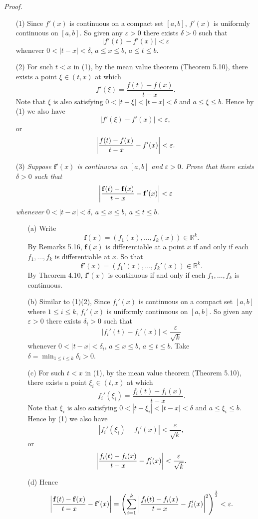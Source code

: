 \documentclass{article}
\begin{document}
\emph{Proof.}
\begin{enumerate}
  \item[(1)]
  Since $f'(x)$ is continuous on a compact set $[a,b]$,
  $f'(x)$ is uniformly continuous on $[a,b]$.
  So given any $\varepsilon > 0$ there exists $\delta > 0$ such that
  \[
    | f'(t) - f'(x) | < \varepsilon
  \]
  whenever $0 < |t-x| < \delta$, $a \leq x \leq b$, $a \leq t \leq b$.

  \item[(2)]
  For such $t < x$ in (1),
  by the mean value theorem (Theorem 5.10),
  there exists a point $\xi \in (t,x)$
  at which
  \[
    f'(\xi) = \frac{f(t)-f(x)}{t-x}.
  \]
  Note that $\xi$ is also satisfying $0 < |t-\xi| < |t-x| < \delta$
  and $a \leq \xi \leq b$.
  Hence by (1) we also have
  \[
    | f'(\xi) - f'(x) | < \varepsilon,
  \]
  or
  \[
    \abs{ \frac{f(t)-f(x)}{t-x} - f'(x) } < \varepsilon.
  \]

  \item[(3)]
  \emph{Suppose $\mathbf{f}'(x)$ is continuous on $[a,b]$ and $\varepsilon > 0$.
  Prove that there exists $\delta > 0$ such that
  \[
    \abs{ \frac{\mathbf{f}(t)-\mathbf{f}(x)}{t-x} - \mathbf{f}'(x) } < \varepsilon
  \]
  whenever $0 < |t-x| < \delta$, $a \leq x \leq b$, $a \leq t \leq b$.}
  \begin{enumerate}
  \item[(a)]
  Write
  \[
    \mathbf{f}(x) = (f_1(x), \ldots, f_k(x)) \in \mathbb{R}^k.
  \]
  By Remarks 5.16,
  $\mathbf{f}(x)$ is differentiable at a point $x$ if and only if
  each $f_1, \ldots, f_k$ is differentiable at $x$.
  So that
  \[
    \mathbf{f}'(x) = (f_1'(x), \ldots, f_k'(x)) \in \mathbb{R}^k.
  \]
  By Theorem 4.10,
  $\mathbf{f}'(x)$ is continuous if and only if
  each $f_1, \ldots, f_k$ is continuous.

  \item[(b)]
  Similar to (1)(2),
  Since $f_i'(x)$ is continuous on a compact set $[a,b]$ where $1 \leq i \leq k$,
  $f_i'(x)$ is uniformly continuous on $[a,b]$.
  So given any $\varepsilon > 0$ there exists $\delta_i > 0$ such that
  \[
    | f_i'(t) - f_i'(x) | < \frac{\varepsilon}{\sqrt{k}}
  \]
  whenever $0 < |t-x| < \delta_i$, $a \leq x \leq b$, $a \leq t \leq b$.
  Take $\delta = \min_{1 \leq i \leq k} \delta_i > 0$.

  \item[(c)]
  For such $t < x$ in (1),
  by the mean value theorem (Theorem 5.10),
  there exists a point $\xi_i \in (t,x)$
  at which
  \[
    f_i'(\xi_i) = \frac{f_i(t)-f_i(x)}{t-x}.
  \]
  Note that $\xi_i$ is also satisfying $0 < |t-\xi_i| < |t-x| < \delta$
  and $a \leq \xi_i \leq b$.
  Hence by (1) we also have
  \[
    | f_i'(\xi_i) - f_i'(x) | < \frac{\varepsilon}{\sqrt{k}},
  \]
  or
  \[
    \abs{ \frac{f_i(t)-f_i(x)}{t-x} - f_i'(x) } < \frac{\varepsilon}{\sqrt{k}}.
  \]

  \item[(d)]
  Hence
  \[
    \abs{ \frac{\mathbf{f}(t)-\mathbf{f}(x)}{t-x} - \mathbf{f}'(x) }
    = \left( \sum_{i=1}^{k} \abs{ \frac{f_i(t)-f_i(x)}{t-x} - f_i'(x) }^2 \right)^{\frac{1}{2}}
    < \varepsilon.
  \]
  \end{enumerate}
\end{enumerate}
\end{document}
